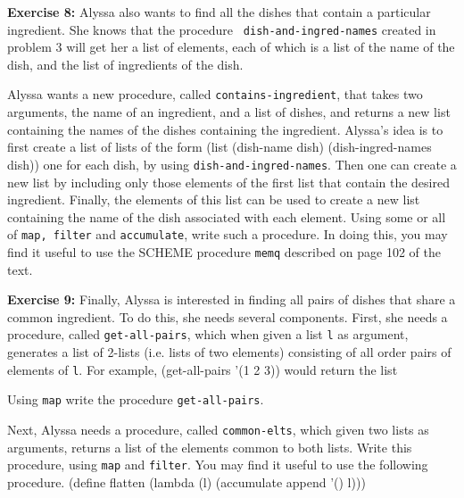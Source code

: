 {\bf Exercise 8:}  Alyssa also wants to find all the dishes that contain
a particular ingredient.  She knows that the procedure {\tt
dish-and-ingred-names} created in 
problem 3 will get her a list of elements, each of which is a list of
the name of the dish, and the list of ingredients of the dish.

Alyssa wants a new procedure,
called {\tt contains-ingredient}, that takes two arguments, the name of
an ingredient, and a list of dishes, and returns a new list containing
the names of the dishes containing the ingredient.  
Alyssa's idea is to first create a list of lists of the form
\beginlisp
(list (dish-name dish) (dish-ingred-names dish))
\endlisp 
one for each dish, by using {\tt dish-and-ingred-names}.  Then one can create a new list by
including only
those elements of the first list that contain the desired ingredient.
Finally, the elements of this list can be used to create a new list
containing the name of the dish associated with each element.  Using
some or all of {\tt map, filter} and {\tt accumulate}, write such a
procedure.  In doing this, you may find it useful to use the SCHEME
procedure {\tt memq} described on page 102 of the text. 


{\bf Exercise 9:}   Finally, Alyssa is interested in finding all pairs
of dishes that share a common ingredient.  To do this, she needs several
components. First, she needs a procedure, called {\tt get-all-pairs},
which when given a list {\tt l} as argument, generates a list of 2-lists
(i.e. lists of two elements) consisting of all order pairs of elements
of {\tt l}.  For example,
\beginlisp 
(get-all-pairs '(1 2 3))
\endlisp
would return the list 
\beginlisp

\endlisp
Using {\tt map} write the procedure {\tt get-all-pairs}.

Next, Alyssa needs a procedure, called {\tt common-elts}, which given
two lists as arguments, returns a list of the elements common to both
lists.  Write this procedure, using {\tt map} and {\tt filter}.  You may
find it useful to use the following procedure.
\beginlisp
(define flatten
  (lambda (l)
    (accumulate append '() l)))
\endlisp


